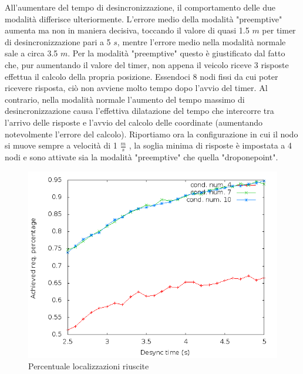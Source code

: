 \documentclass[Lau,binding=0.6cm]{sapthesis}
\begin{document}
All'aumentare del tempo di desincronizzazione, il comportamento delle due modalità differisce ulteriormente. L'errore medio della modalità "preemptive" aumenta ma non in maniera decisiva, toccando il valore di quasi 1.5 $m$ per timer di desincronizzazione pari a 5 $s$, mentre l'errore medio nella modalità normale sale a circa 3.5 $m$. Per la modalità "preemptive" questo è giustificato dal fatto che, pur aumentando il valore del timer, non appena il veicolo riceve 3 risposte effettua il calcolo della propria posizione. Essendoci 8 nodi fissi da cui poter ricevere risposta, ciò non avviene molto tempo dopo l'avvio del timer. Al contrario, nella modalità normale l'aumento del tempo massimo di desincronizzazione causa l'effettiva dilatazione del tempo che intercorre tra l'arrivo delle risposte e l'avvio del calcolo delle coordinate (aumentando notevolmente l'errore del calcolo).
Riportiamo ora la configurazione in cui il nodo si muove sempre a velocità di 1 $\frac{m}{s}$ , la soglia minima di risposte è impostata a 4 nodi e sono attivate sia la modalità "preemptive" che quella "droponepoint". 
\begin{figure}[H]
    \centering
    \includegraphics[scale=0.5]{octagonsimulation/achievedlocreq4preempt1drop1speed1.png}
    \caption{Percentuale localizzazioni riuscite}
    \label{fig:octagonsimulation/achievedlocreq4preempt1drop1speed1}
\end{figure}
\end{document}
